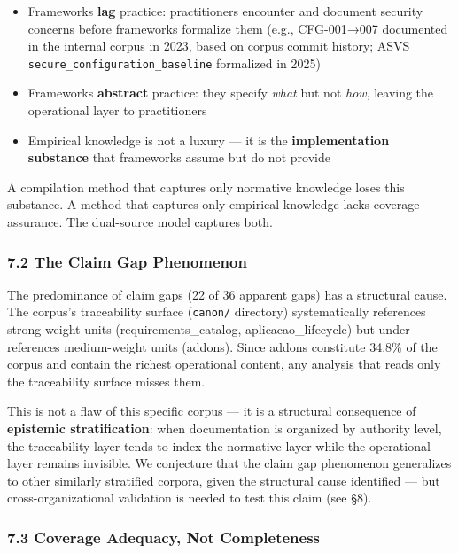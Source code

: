 \documentclass[
]{article}
\providecommand{\tightlist}{%
  \setlength{\itemsep}{0pt}\setlength{\parskip}{0pt}}
\begin{document}
\begin{itemize}
\tightlist
\item
  Frameworks \textbf{lag} practice: practitioners encounter and document
  security concerns before frameworks formalize them (e.g., CFG-001→007
  documented in the internal corpus in 2023, based on corpus commit
  history; ASVS \texttt{secure\_configuration\_baseline} formalized in
  2025)
\item
  Frameworks \textbf{abstract} practice: they specify \emph{what} but
  not \emph{how}, leaving the operational layer to practitioners
\item
  Empirical knowledge is not a luxury --- it is the
  \textbf{implementation substance} that frameworks assume but do not
  provide
\end{itemize}

A compilation method that captures only normative knowledge loses this
substance. A method that captures only empirical knowledge lacks
coverage assurance. The dual-source model captures both.

\subsubsection{7.2 The Claim Gap
Phenomenon}\label{the-claim-gap-phenomenon}

The predominance of claim gaps (22 of 36 apparent gaps) has a structural
cause. The corpus's traceability surface (\texttt{canon/} directory)
systematically references strong-weight units (requirements\_catalog,
aplicacao\_lifecycle) but under-references medium-weight units (addons).
Since addons constitute 34.8\% of the corpus and contain the richest
operational content, any analysis that reads only the traceability
surface misses them.

This is not a flaw of this specific corpus --- it is a structural
consequence of \textbf{epistemic stratification}: when documentation is
organized by authority level, the traceability layer tends to index the
normative layer while the operational layer remains invisible. We
conjecture that the claim gap phenomenon generalizes to other similarly
stratified corpora, given the structural cause identified --- but
cross-organizational validation is needed to test this claim (see §8).

\subsubsection{7.3 Coverage Adequacy, Not
Completeness}\label{coverage-adequacy-not-completeness}
\end{document}
